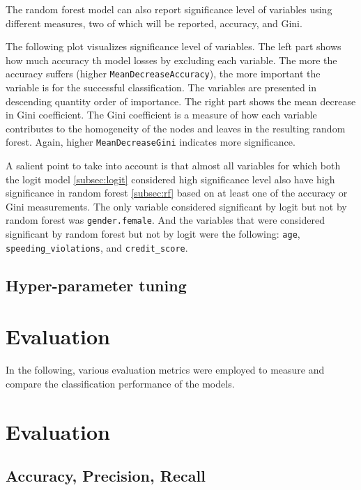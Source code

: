 \documentclass{article}
\begin{document}
The random forest model can also report significance level of variables
using different measures, two of which will be reported, accuracy, and
Gini.

The following plot visualizes significance level of variables. The left
part shows how much accuracy th model losses by excluding each variable.
The more the accuracy suffers (higher \texttt{MeanDecreaseAccuracy}),
the more important the variable is for the successful classification.
The variables are presented in descending quantity order of importance.
The right part shows the mean decrease in Gini coefficient. The Gini
coefficient is a measure of how each variable contributes to the
homogeneity of the nodes and leaves in the resulting random forest.
Again, higher \texttt{MeanDecreaseGini} indicates more significance.

A salient point to take into account is that almost all variables for
which both the logit model \ref{subsec:logit} considered high
significance level also have high significance in random forest
\ref{subsec:rf} based on at least one of the accuracy or Gini
measurements. The only variable considered significant by logit but not
by random forest was \texttt{gender.female}. And the variables that were
considered significant by random forest but not by logit were the
following: \texttt{age}, \texttt{speeding\_violations}, and
\texttt{credit\_score}.

\hypertarget{hyper-parameter-tuning}{%
\subsection{Hyper-parameter tuning}\label{hyper-parameter-tuning}}

\hypertarget{evaluation}{%
\section{\texorpdfstring{Evaluation
\label{sec:evaluation}}{Evaluation }}\label{evaluation}}

In the following, various evaluation metrics were employed to measure
and compare the classification performance of the models.

\hypertarget{evaluation-1}{%
\section{Evaluation}\label{evaluation-1}}

\hypertarget{accuracy-precision-recall}{%
\subsection{Accuracy, Precision,
Recall}\label{accuracy-precision-recall}}
\end{document}
